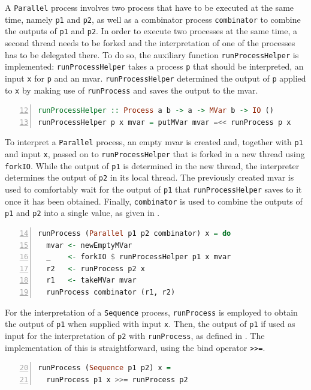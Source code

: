 A \texttt{Parallel} process involves two process that have to be executed at the same time, namely \texttt{p1} and \texttt{p2}, as well as a combinator process \texttt{combinator} to combine the outputs of \texttt{p1} and \texttt{p2}. In order to execute two processes at the same time, a second thread needs to be forked and the interpretation of one of the processes has to be delegated there. To do so, the auxiliary function \texttt{runProcessHelper} is implemented: \texttt{runProcessHelper} takes a process \texttt{p} that should be interpreted, an input \texttt{x} for \texttt{p} and an mvar. \texttt{runProcessHelper} determined the output of \texttt{p} applied to \texttt{x} by making use of \texttt{runProcess} and saves the output to the mvar.
\begin{lstlisting}[language=Haskell,caption=Auxiliary function for the interpretation of \texttt{Parallel} processes.,label=lst:local_runprocesshelper,numbers=left,frame=bt,firstnumber=12]
runProcessHelper :: Process a b -> a -> MVar b -> IO ()
runProcessHelper p x mvar = putMVar mvar =<< runProcess p x
\end{lstlisting}

To interpret a \texttt{Parallel} process, an empty mvar is created and, together with \texttt{p1} and input \texttt{x}, passed on to \texttt{runProcessHelper} that is forked in a new thread using \texttt{forkIO}. While the output of \texttt{p1} is determined in the new thread, the interpreter determines the output of \texttt{p2} in its local thread. The previously created mvar is used to comfortably wait for the output of \texttt{p1} that \texttt{runProcessHelper} saves to it once it has been obtained. Finally, \texttt{combinator} is used to combine the outputs of \texttt{p1} and \texttt{p2} into a single value, as given in .
\begin{lstlisting}[language=Haskell,caption=Implementation of the interpreter for \texttt{Parallel} processes.,numbers=left,frame=bt,label=lst:local_runprocess_parallel,firstnumber=14]
runProcess (Parallel p1 p2 combinator) x = do
  mvar <- newEmptyMVar
  _    <- forkIO $ runProcessHelper p1 x mvar
  r2   <- runProcess p2 x
  r1   <- takeMVar mvar
  runProcess combinator (r1, r2)
\end{lstlisting}

For the interpretation of a \texttt{Sequence} process, \texttt{runProcess} is employed to obtain the output of \texttt{p1} when supplied with input \texttt{x}. Then, the output of \texttt{p1} if used as input for the interpretation of \texttt{p2} with \texttt{runProcess}, as defined in . The implementation of this is straightforward, using the bind operator \texttt{>}\texttt{>=}.
\begin{lstlisting}[language=Haskell,caption=Implementation of the interpreter for \texttt{Sequence} processes.,label=lst:local_runprocess_sequence,numbers=left,frame=bt,firstnumber=20]
runProcess (Sequence p1 p2) x =
  runProcess p1 x >>= runProcess p2
\end{lstlisting}

